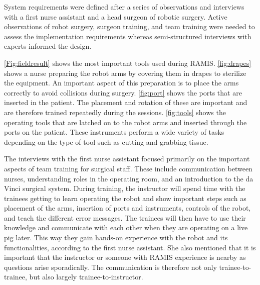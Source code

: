 \documentclass[conference]{IEEEtran}
\begin{document}
System requirements were defined after a series of observations and interviews with a first nurse assistant and a head surgeon of robotic surgery. Active observations of robot surgery, surgeon training, and team training were needed to assess the implementation requirements whereas semi-structured interviews with experts informed the design. %

\autoref{Fig:fieldresult} shows the most important tools used during RAMIS. \autoref{fig:drapes} shows a nurse preparing the robot arms by covering them in drapes to sterilize the equipment. An important aspect of this preparation is to place the arms correctly to avoid collisions during surgery. \autoref{fig:port} shows the ports that are inserted in the patient. The placement and rotation of these are important and are therefore trained repeatedly during the sessions. \autoref{fig:tools} shows the operating tools that are latched on to the robot arms and inserted through the ports on the patient. These instruments perform a wide variety of tasks depending on the type of tool such as cutting and grabbing tissue.


The interviews with the first nurse assistant focused primarily on the important aspects of team training for surgical staff. These include communication between nurses, understanding roles in the operating room, and an introduction to the da Vinci surgical system. During training, the instructor will spend time with the trainees getting to learn operating the robot and show important steps such as placement of the arms, insertion of ports and instruments, controls of the robot, and teach the different error messages. The trainees will then have to use their knowledge and communicate with each other when they are operating on a live pig later. This way they gain hands-on experience with the robot and its functionalities, according to the first nurse assistant. She also mentioned that it is important that the instructor or someone with RAMIS experience is nearby as questions arise sporadically. The communication is therefore not only trainee-to-trainee, but also largely trainee-to-instructor.%
\end{document}
